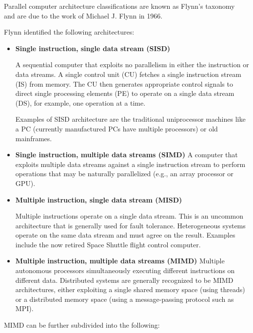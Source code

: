 \documentclass[justified,sixbynine]{tufte-book}
\theoremstyle{plain}%
\theoremstyle{definition}
\theoremstyle{remark}
\begin{document}
\begin{fullwidth}


Parallel computer architecture classifications are known as Flynn's taxonomy~\cite{flynn} and are due to the work of Michael J. Flynn in 1966.

Flynn identified the following architectures:

\begin{itemize}
\item {\bf Single instruction, single data stream (SISD)}

A sequential computer that exploits no parallelism in either the instruction or data streams. A single control unit (CU) fetches a single instruction stream (IS) from memory. The CU then generates appropriate control signals to direct single processing elements (PE) to operate on a single data stream (DS), for example, one operation at a time.

Examples of SISD architecture are the traditional uniprocessor machines like a PC (currently manufactured PCs have multiple processors) or old mainframes.

\item {\bf Single instruction, multiple data streams (SIMD)}
A  computer  that   exploits   multiple  data   streams   against  a  single instruction stream  to perform operations that  may be naturally parallelized (e.g., an array processor or GPU).

\item {\bf Multiple instruction, single data stream (MISD)}

Multiple instructions operate on a single data stream. This is an uncommon architecture that is generally used for fault tolerance. Heterogeneous systems operate on the same data stream and must agree on the result. Examples include the now retired Space Shuttle flight control computer.

\item {\bf Multiple instruction, multiple data streams (MIMD)}
Multiple autonomous processors simultaneously executing different instructions on different data. Distributed systems are generally recognized to be MIMD architectures, either exploiting a single shared memory space (using threads) or a distributed memory space (using a message-passing protocol such as MPI).
\end{itemize}


MIMD can be further subdivided into the following:
\begin{itemize}


\end{itemize}
\end{fullwidth}
\end{document}
